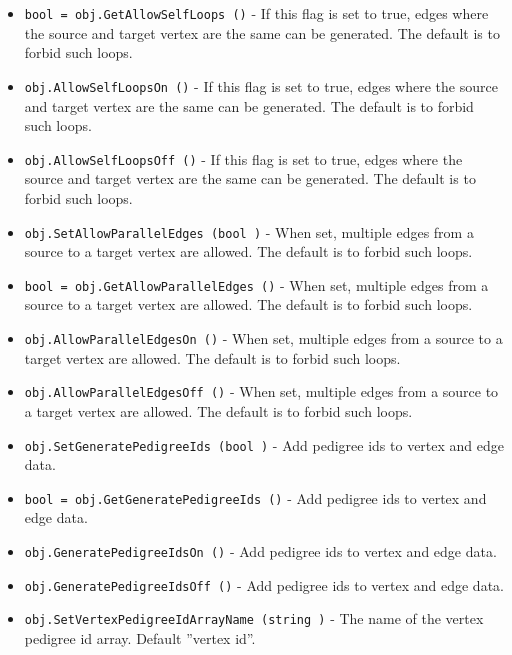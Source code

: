\begin{itemize}
\item  \verb|bool = obj.GetAllowSelfLoops ()| -  If this flag is set to true, edges where the source and target
 vertex are the same can be generated.  The default is to forbid
 such loops.

\item  \verb|obj.AllowSelfLoopsOn ()| -  If this flag is set to true, edges where the source and target
 vertex are the same can be generated.  The default is to forbid
 such loops.

\item  \verb|obj.AllowSelfLoopsOff ()| -  If this flag is set to true, edges where the source and target
 vertex are the same can be generated.  The default is to forbid
 such loops.

\item  \verb|obj.SetAllowParallelEdges (bool )| -  When set, multiple edges from a source to a target vertex are
 allowed. The default is to forbid such loops.

\item  \verb|bool = obj.GetAllowParallelEdges ()| -  When set, multiple edges from a source to a target vertex are
 allowed. The default is to forbid such loops.

\item  \verb|obj.AllowParallelEdgesOn ()| -  When set, multiple edges from a source to a target vertex are
 allowed. The default is to forbid such loops.

\item  \verb|obj.AllowParallelEdgesOff ()| -  When set, multiple edges from a source to a target vertex are
 allowed. The default is to forbid such loops.

\item  \verb|obj.SetGeneratePedigreeIds (bool )| -  Add pedigree ids to vertex and edge data.

\item  \verb|bool = obj.GetGeneratePedigreeIds ()| -  Add pedigree ids to vertex and edge data.

\item  \verb|obj.GeneratePedigreeIdsOn ()| -  Add pedigree ids to vertex and edge data.

\item  \verb|obj.GeneratePedigreeIdsOff ()| -  Add pedigree ids to vertex and edge data.

\item  \verb|obj.SetVertexPedigreeIdArrayName (string )| -  The name of the vertex pedigree id array. Default ''vertex id''.


\end{itemize}
